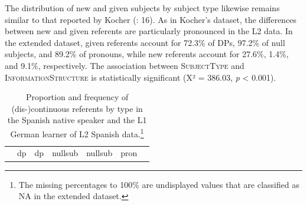 \documentclass[
  letterpaper,
  DIV=11,
  numbers=noendperiod]{scrartcl}
\begin{document}
The distribution of new and given subjects by subject type likewise
remains similar to that reported by Kocher
(: 16). As in Kocher's dataset,
the differences between new and given referents are particularly
pronounced in the L2 data. In the extended dataset, given referents
account for 72.3\% of DPs, 97.2\% of null subjects, and 89.2\% of
pronouns, while new referents account for 27.6\%, 1.4\%, and 9.1\%,
respectively. The association between \textsc{SubjectType} and
\textsc{InformationStructure} is statistically significant (X² = 386.03,
\emph{p} \textless{} 0.001).

\begin{longtable}[]{@{}
  >{\raggedright\arraybackslash}p{}
  >{\centering\arraybackslash}p{}
  >{\centering\arraybackslash}p{}
  >{\centering\arraybackslash}p{}
  >{\centering\arraybackslash}p{}
  >{\centering\arraybackslash}p{}
  >{\centering\arraybackslash}p{}@{}}
\caption[Proportion and frequency of (dis-)continuous referents by type
in the Spanish native speaker and the L1 German learner of L2 Spanish
data.]{Proportion and frequency of (dis-)continuous referents by type in
the Spanish native speaker and the L1 German learner of L2 Spanish
data.\footnote{The missing percentages to 100\% are undisplayed values
  that are classified as NA in the extended dataset.}}\label{tbl-referential-continuity}\tabularnewline
\toprule\noalign{}
\begin{minipage}[b]{\linewidth}\raggedright
\end{minipage} & \begin{minipage}[b]{\linewidth}\centering
dp
\end{minipage} & \begin{minipage}[b]{\linewidth}\centering
dp
\end{minipage} & \begin{minipage}[b]{\linewidth}\centering
nullsub
\end{minipage} & \begin{minipage}[b]{\linewidth}\centering
nullsub
\end{minipage} & \begin{minipage}[b]{\linewidth}\centering
pron
\end{minipage} & \begin{minipage}[b]{\linewidth}\centering

\end{minipage}
\end{longtable}
\end{document}
